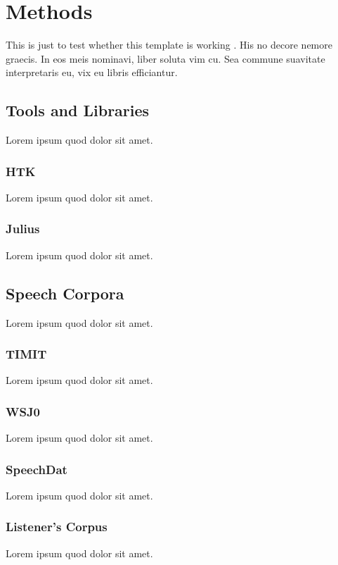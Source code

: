 \chapter{Methods}\label{ch:methods}
This is just to test whether this template is working
\citeauthor{dueck:trio} \citep{dueck:trio}. His no decore
nemore graecis. In eos meis nominavi, liber soluta vim cu. Sea commune
suavitate interpretaris eu, vix eu libris efficiantur.



\section{Tools and Libraries}
Lorem ipsum quod dolor sit amet.

\subsection{HTK}
Lorem ipsum quod dolor sit amet.

\subsection{Julius}
Lorem ipsum quod dolor sit amet.

\section{Speech Corpora}
Lorem ipsum quod dolor sit amet.

\subsection{TIMIT}
Lorem ipsum quod dolor sit amet.

\subsection{WSJ0}
Lorem ipsum quod dolor sit amet.

\subsection{SpeechDat}
Lorem ipsum quod dolor sit amet.

\subsection{Listener's Corpus}
Lorem ipsum quod dolor sit amet.

